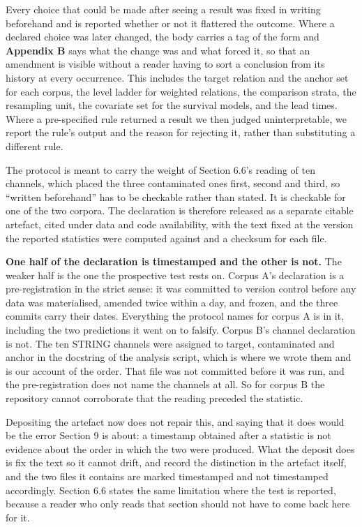 \documentclass[twoside,11pt]{article}
\begin{document}
Every choice that could be made after seeing a result was fixed in writing beforehand and is reported whether or not it flattered the outcome. Where a declared choice was later changed, the body carries a tag of the form and \textbf{Appendix B} says what the change was and what forced it, so that an amendment is visible without a reader having to sort a conclusion from its history at every occurrence. This includes the target relation and the anchor set for each corpus, the level ladder for weighted relations, the comparison strata, the resampling unit, the covariate set for the survival models, and the lead times. Where a pre-specified rule returned a result we then judged uninterpretable, we report the rule's output and the reason for rejecting it, rather than substituting a different rule.

The protocol is meant to carry the weight of Section 6.6's reading of ten channels, which placed the three contaminated ones first, second and third, so ``written beforehand'' has to be checkable rather than stated. It is checkable for one of the two corpora. The declaration is therefore released as a separate citable artefact, cited under data and code availability, with the text fixed at the version the reported statistics were computed against and a checksum for each file.

\textbf{One half of the declaration is timestamped and the other is not.} The weaker half is the one the prospective test rests on. Corpus A's declaration is a pre-registration in the strict sense: it was committed to version control before any data was materialised, amended twice within a day, and frozen, and the three commits carry their dates. Everything the protocol names for corpus A is in it, including the two predictions it went on to falsify. Corpus B's channel declaration is not. The ten STRING channels were assigned to target, contaminated and anchor in the docstring of the analysis script, which is where we wrote them and is our account of the order. That file was not committed before it was run, and the pre-registration does not name the channels at all. So for corpus B the repository cannot corroborate that the reading preceded the statistic.

Depositing the artefact now does not repair this, and saying that it does would be the error Section 9 is about: a timestamp obtained after a statistic is not evidence about the order in which the two were produced. What the deposit does is fix the text so it cannot drift, and record the distinction in the artefact itself, and the two files it contains are marked timestamped and not timestamped accordingly. Section 6.6 states the same limitation where the test is reported, because a reader who only reads that section should not have to come back here for it.
\end{document}
